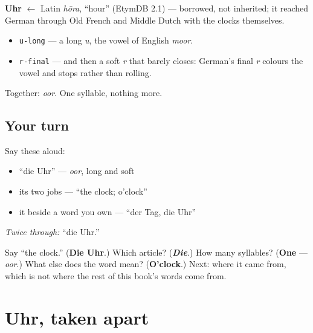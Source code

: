 \begin{cousinweb}
\textbf{Uhr} $\leftarrow$ Latin \emph{hōra}, \textquotedblleft{}hour\textquotedblright{} (EtymDB 2.1) — borrowed, not inherited; it reached German through Old French and Middle Dutch with the clocks themselves.
\end{cousinweb}

\begin{sounds}
\begin{itemize}
\raggedright
  \item \texttt{u-long} — a long \emph{u}, the vowel of English \emph{moor}.
  \item \texttt{r-final} — and then a soft \emph{r} that barely closes: German's final \emph{r} colours the vowel and stops rather than rolling.
\end{itemize}

Together: \emph{oor}. One syllable, nothing more.
\end{sounds}

\subsection*{Your turn}
Say these aloud:

\begin{itemize}
\raggedright
  \item \textquotedblleft{}die Uhr\textquotedblright{} — \emph{oor}, long and soft
  \item its two jobs — \textquotedblleft{}the clock; o'clock\textquotedblright{}
  \item it beside a word you own — \textquotedblleft{}der Tag, die Uhr\textquotedblright{}
\end{itemize}

\emph{Twice through:} \textquotedblleft{}die Uhr.\textquotedblright{}

\begin{tcolorbox}[breakable,colback=teal!4,colframe=teal!35!black,title={Before you move on}]
Say \textquotedblleft{}the clock.\textquotedblright{} (\textbf{Die Uhr}.) Which article? (\emph{\textbf{Die}}.) How many syllables? (\textbf{One} — \emph{oor}.) What else does the word mean? (\textbf{O'clock}.) Next: where it came from, which is not where the rest of this book's words come from.
\end{tcolorbox}
\section[Uhr und hōra]{Uhr, taken apart}

